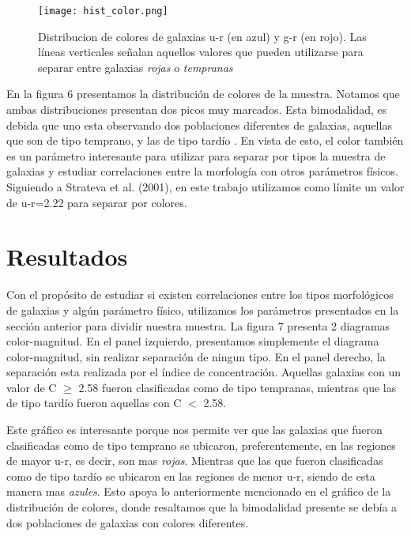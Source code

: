 \documentclass[a4paper,10pt]{article}
\begin{document}
\begin{figure}[h]
 \centering
 \texttt{[image: hist\_color.png]}
 \caption{Distribucion de colores de galaxias u-r (en azul) y g-r (en rojo). Las l\'ineas verticales se\~nalan aquellos valores que pueden utilizarse para separar entre galaxias \textit{rojas} o \textit{tempranas}}
 \label{6}
\end{figure}


En la figura 6 presentamos la distribuci\'on de colores de la muestra. Notamos que ambas distribuciones presentan dos picos muy marcados. 
Esta bimodalidad, es debida que uno esta observando dos poblaciones diferentes de galaxias, aquellas que son de tipo temprano, y las de tipo tard\'io \citep{Strateva2001}. En vista de esto, el color tambi\'en es un par\'ametro interesante para utilizar para separar por tipos la muestra de galaxias y estudiar correlaciones entre la morfolog\'ia con otros par\'ametros f\'isicos. 
Siguiendo a Strateva et al. (2001), en este trabajo utilizamos como l\'imite un valor de u-r=2.22 para separar por colores.

\section{Resultados}

Con el prop\'osito de estudiar si existen correlaciones entre los tipos morfol\'ogicos de galaxias y alg\'un par\'ametro f\'isico, utilizamos los par\'ametros presentados en la secci\'on anterior para dividir nuestra muestra.
La figura 7 presenta 2 diagramas color-magnitud. En el panel izquierdo, presentamos simplemente el diagrama color-magnitud, sin realizar separaci\'on de ningun tipo. En el panel derecho, la separaci\'on esta realizada por el \'indice de concentraci\'on. Aquellas galaxias con un valor de C $\geq$ 2.58 fueron clasificadas como de tipo tempranas, mientras que las de tipo tard\'io fueron aquellas con C $<$ 2.58. 

Este gr\'afico es interesante porque nos permite ver que las galaxias que fueron clasificadas como de tipo temprano se ubicaron, preferentemente, en las regiones de mayor u-r, es decir, son mas \textit{rojas}. Mientras que las que fueron clasificadas como de tipo tard\'io se ubicaron en las regiones de menor u-r, siendo de esta manera mas \textit{azules}. Esto apoya lo anteriormente mencionado en el gr\'afico de la distribuci\'on de colores, donde resaltamos que la bimodalidad presente se deb\'ia a dos poblaciones de galaxias con colores diferentes.
\end{document}
